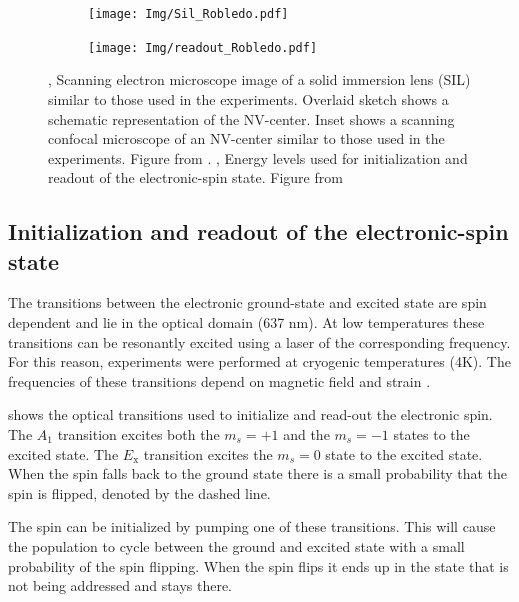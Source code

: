 \begin{figure}[htbp]
    \centering
    \begin{subfigure}[t]{0.49\textwidth}\centering
        \caption{}
        \label{fig:Sil_Robledo}
        \texttt{[image: Img/Sil\_Robledo.pdf]}
    \end{subfigure}
    \begin{subfigure}[t]{0.49\textwidth}\centering
       \caption{}
       \label{fig:readoutRobledo}
       \texttt{[image: Img/readout\_Robledo.pdf]}
   \end{subfigure}
   \caption{, Scanning electron microscope image of  a solid immersion lens (SIL) similar to those used in the experiments. Overlaid sketch shows a schematic representation of the NV-center. Inset shows a scanning confocal microscope of an NV-center similar to those used in the experiments. Figure from \citep{Robledo2011HighFidelity}.  , Energy levels used for initialization and readout of the electronic-spin state. Figure from \citep{Robledo2011HighFidelity}}
\end{figure}

\subsection{Initialization and readout of the electronic-spin state}
The transitions between the electronic ground-state and excited state are spin dependent and lie in the optical domain (637 nm).
At low temperatures these transitions can be resonantly excited using a laser of the corresponding frequency.
For this reason, experiments were performed at cryogenic temperatures (4K).
The frequencies of these transitions depend on magnetic field and strain \citep{Hensen2011MeasurementBased}.

 shows the optical transitions used to initialize and read-out the electronic spin.
The $A_1$ transition excites both the $m_s =+1$ and the $m_s=-1$ states to the excited state.
The $E_\mathrm{x}$ transition excites the $m_s = 0$ state to the excited state.
When the spin falls back to the ground state there is a small probability that the spin is flipped, denoted by the dashed line.

The spin can be initialized by pumping one of these transitions\citep{Robledo2011HighFidelity}.
This will cause the population to cycle between the ground and excited state with a small probability of the spin flipping.
When the spin flips it ends up in the state that is not being addressed and stays there.


